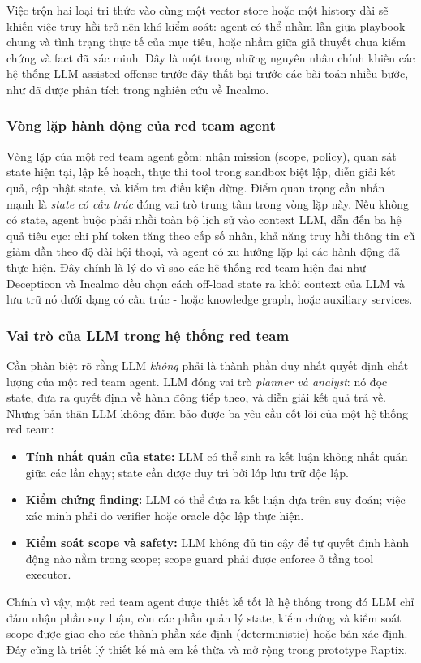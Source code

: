 Việc trộn hai loại tri thức vào cùng một vector store hoặc một history dài sẽ khiến việc truy hồi trở nên khó kiểm soát: agent có thể nhầm lẫn giữa playbook chung và tình trạng thực tế của mục tiêu, hoặc nhầm giữa giả thuyết chưa kiểm chứng và fact đã xác minh. Đây là một trong những nguyên nhân chính khiến các hệ thống LLM-assisted offense trước đây thất bại trước các bài toán nhiều bước, như đã được phân tích trong nghiên cứu về Incalmo.

\subsubsection*{Vòng lặp hành động của red team agent}

Vòng lặp của một red team agent gồm: nhận mission (scope, policy), quan sát state hiện tại, lập kế hoạch, thực thi tool trong sandbox biệt lập, diễn giải kết quả, cập nhật state, và kiểm tra điều kiện dừng. Điểm quan trọng cần nhấn mạnh là \emph{state có cấu trúc} đóng vai trò trung tâm trong vòng lặp này. Nếu không có state, agent buộc phải nhồi toàn bộ lịch sử vào context LLM, dẫn đến ba hệ quả tiêu cực: chi phí token tăng theo cấp số nhân, khả năng truy hồi thông tin cũ giảm dần theo độ dài hội thoại, và agent có xu hướng lặp lại các hành động đã thực hiện. Đây chính là lý do vì sao các hệ thống red team hiện đại như Decepticon và Incalmo đều chọn cách off-load state ra khỏi context của LLM và lưu trữ nó dưới dạng có cấu trúc - hoặc knowledge graph, hoặc auxiliary services.

\subsubsection*{Vai trò của LLM trong hệ thống red team}

Cần phân biệt rõ rằng LLM \emph{không} phải là thành phần duy nhất quyết định chất lượng của một red team agent. LLM đóng vai trò \emph{planner và analyst}: nó đọc state, đưa ra quyết định về hành động tiếp theo, và diễn giải kết quả trả về. Nhưng bản thân LLM không đảm bảo được ba yêu cầu cốt lõi của một hệ thống red team:

\begin{itemize}
    \item \textbf{Tính nhất quán của state:} LLM có thể sinh ra kết luận không nhất quán giữa các lần chạy; state cần được duy trì bởi lớp lưu trữ độc lập.
    \item \textbf{Kiểm chứng finding:} LLM có thể đưa ra kết luận dựa trên suy đoán; việc xác minh phải do verifier hoặc oracle độc lập thực hiện.
    \item \textbf{Kiểm soát scope và safety:} LLM không đủ tin cậy để tự quyết định hành động nào nằm trong scope; scope guard phải được enforce ở tầng tool executor.
\end{itemize}

Chính vì vậy, một red team agent được thiết kế tốt là hệ thống trong đó LLM chỉ đảm nhận phần suy luận, còn các phần quản lý state, kiểm chứng và kiểm soát scope được giao cho các thành phần xác định (deterministic) hoặc bán xác định. Đây cũng là triết lý thiết kế mà em kế thừa và mở rộng trong prototype Raptix.